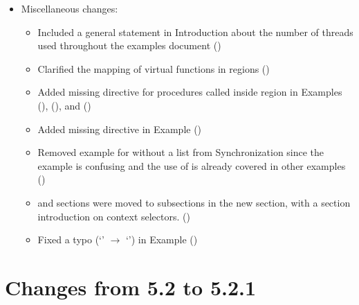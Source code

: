 \begin{itemize}
\item Miscellaneous changes:
\begin{itemize}
  \item Included a general statement in Introduction about the number of 
    threads used throughout the examples document ()
  \item Clarified the mapping of virtual functions in  regions
    ()
  \item Added missing  directive for procedures
    called inside  region in Examples
     (),
     (), 
    and 
    ()
  \item Added missing  directive in Example
     ()
  \item Removed example for  without a list from Synchronization 
    since the example is confusing and the use of  is already
    covered in other examples
    ()
  \item {} and  sections were moved to
         subsections in the new  section, 
         with a section introduction on context selectors.
    ()
  \item Fixed a typo (`' $\rightarrow$ `') in 
    Example 
    ()
\end{itemize}

\end{itemize}

\section{Changes from 5.2 to 5.2.1}
\label{sec:history_52_to_521}


